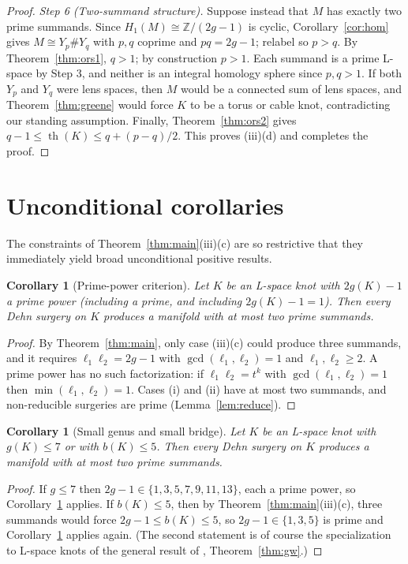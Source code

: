 \documentclass[11pt]{amsart}
\newtheorem{corollary}[theorem]{Corollary}
\theoremstyle{definition}
\theoremstyle{remark}
\numberwithin{equation}{section}
\begin{document}
\begin{proof}
\noindent\emph{Step 6 (Two-summand structure).} Suppose instead that $M$
has exactly two prime summands. Since $H_{1}(M)\cong\mathbb{Z}/(2g-1)$
is cyclic, Corollary~\ref{cor:hom} gives
$M\cong Y_{p}\#Y_{q}$ with $p,q$ coprime and $pq=2g-1$; relabel so
$p>q$. By Theorem~\ref{thm:ors1}, $q>1$; by construction $p>1$. Each
summand is a prime L-space by Step 3, and neither is an integral
homology sphere since $p,q>1$. If both $Y_{p}$ and $Y_{q}$ were lens
spaces, then $M$ would be a connected sum of lens spaces, and
Theorem~\ref{thm:greene} would force $K$ to be a torus or cable knot,
contradicting our standing assumption. Finally,
Theorem~\ref{thm:ors2} gives
$q-1\le\operatorname{th}(K)\le q+(p-q)/2$. This proves (iii)(d) and
completes the proof.
\end{proof}

\section{Unconditional corollaries}\label{sec:cor}

The constraints of Theorem~\ref{thm:main}(iii)(c) are so restrictive that
they immediately yield broad unconditional positive results.

\begin{corollary}[Prime-power criterion]\label{cor:pp}
Let $K$ be an L-space knot with $2g(K)-1$ a prime power (including a
prime, and including $2g(K)-1=1$). Then every Dehn surgery on $K$
produces a manifold with at most two prime summands.
\end{corollary}

\begin{proof}
By Theorem~\ref{thm:main}, only case (iii)(c) could produce three
summands, and it requires $\ell_{1}\ell_{2}=2g-1$ with
$\gcd(\ell_{1},\ell_{2})=1$ and $\ell_{1},\ell_{2}\ge2$. A prime power
has no such factorization: if $\ell_{1}\ell_{2}=t^{k}$ with
$\gcd(\ell_{1},\ell_{2})=1$ then $\min(\ell_{1},\ell_{2})=1$. Cases (i)
and (ii) have at most two summands, and non-reducible surgeries are
prime (Lemma~\ref{lem:reduce}).
\end{proof}

\begin{corollary}[Small genus and small bridge]\label{cor:small}
Let $K$ be an L-space knot with $g(K)\le7$ or with $b(K)\le5$. Then every
Dehn surgery on $K$ produces a manifold with at most two prime summands.
\end{corollary}

\begin{proof}
If $g\le7$ then $2g-1\in\{1,3,5,7,9,11,13\}$, each a prime power, so
Corollary~\ref{cor:pp} applies. If $b(K)\le5$, then by
Theorem~\ref{thm:main}(iii)(c), three summands would force
$2g-1\le b(K)\le5$, so $2g-1\in\{1,3,5\}$ is prime and
Corollary~\ref{cor:pp} applies again. (The second statement is of course
the specialization to L-space knots of the general result of
\cite{GW}, Theorem~\ref{thm:gw}.)
\end{proof}
\end{document}
